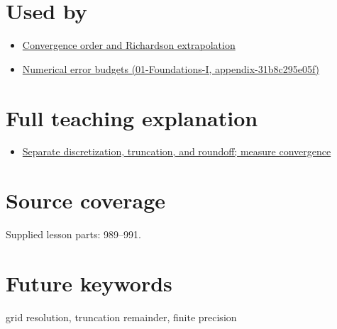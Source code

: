 \section{Used by}\label{appendix-6b0648b2b8e8-used-by}

\begin{itemize}
\tightlist
\item
  \hyperref[appendix-aca80b6bf17a]{Convergence order and Richardson extrapolation}
\item
  \href{../01-Foundations-I/main.pdf\#nameddest=appendix-31b8c295e05f}{Numerical error budgets (01-Foundations-I, appendix-31b8c295e05f)}
\end{itemize}

\section{Full teaching explanation}\label{appendix-6b0648b2b8e8-full-teaching-explanation}

\begin{itemize}
\tightlist
\item
  \href{Continuous\%20Notes/Computing\%20Foundations\%20-\%20From\%20Bits\%20to\%20C++\%20and\%20Systems\%20APIs\#Separate\%20discretization,\%20truncation,\%20and\%20roundoff;\%20measure\%20convergence}{Separate discretization, truncation, and roundoff; measure convergence}
\end{itemize}

\section{Source coverage}\label{appendix-6b0648b2b8e8-source-coverage}

Supplied lesson parts: 989--991.

\section{Future keywords}\label{appendix-6b0648b2b8e8-future-keywords}

grid resolution, truncation remainder, finite precision
